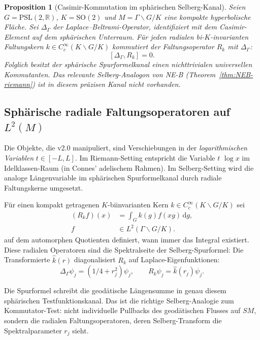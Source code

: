 \documentclass[12pt,a4paper]{article}
\newtheorem{proposition}[theorem]{Proposition}
\theoremstyle{definition}
\theoremstyle{remark}
\newcommand{\RR}{\mathbb{R}}
\newcommand{\Delop}{\Delta_{\Gamma}}
\begin{document}
\begin{proposition}[Casimir-Kommutation im sphärischen Selberg-Kanal]
\label{thm:NEB-fail}
Seien $G=\mathrm{PSL}(2,\RR)$, $K=\mathrm{SO}(2)$ und
$M=\Gamma\backslash G/K$ eine kompakte hyperbolische Fläche.  Sei $\Delop$
der Laplace--Beltrami-Operator, identifiziert mit dem Casimir-Element auf dem
sphärischen Unterraum.  Für jeden radialen bi-$K$-invarianten Faltungskern
$k\in C_c^\infty(K\backslash G/K)$ kommutiert der Faltungsoperator
$R_k$ mit $\Delop$:
\begin{equation}
\label{eq:NEB-commut}
[\Delop, R_k] = 0.
\end{equation}
Folglich besitzt der sphärische Spurformelkanal einen nichttrivialen
universellen Kommutanten. Das relevante Selberg-Analogon von NE-B
(Theorem~\ref{thm:NEB-riemann}) ist in diesem präzisen Kanal nicht vorhanden.
\end{proposition}

\subsection{\texorpdfstring{Sphärische radiale Faltungsoperatoren auf $L^2(M)$}{Sphaerische radiale Faltungsoperatoren auf L2(M)}}

Die Objekte, die v2.0 manipuliert, sind Verschiebungen in der \emph{logarithmischen Variablen}
$t \in [-L, L]$. Im Riemann-Setting entspricht die Variable $t$
$\log x$ im Idelklassen-Raum (in Connes' adelischem Rahmen). Im
Selberg-Setting wird die analoge Längenvariable im sphärischen
Spurformelkanal durch radiale Faltungskerne umgesetzt.

Für einen kompakt getragenen $K$-biinvarianten Kern
$k\in C_c^\infty(K\backslash G/K)$ sei
\[
\begin{aligned}
(R_k f)(x)&=\int_G k(g)f(xg)\,\mathrm{d}g,\\
f&\in L^2(\Gamma\backslash G/K).
\end{aligned}
\]
auf dem automorphen Quotienten definiert, wann immer das Integral existiert.
Diese radialen Operatoren sind die Spektralseite der Selberg-Spurformel: Die
Transformierte $\widehat{k}(r)$ diagonalisiert $R_k$ auf
Laplace-Eigenfunktionen:
\[
\Delop\psi_j=(1/4+r_j^2)\psi_j,
\qquad
R_k\psi_j=\widehat{k}(r_j)\psi_j.
\]

Die Spurformel schreibt die geodätische Längensumme in genau diesem
sphärischen Testfunktionskanal.  Das ist die richtige Selberg-Analogie zum
Kommutator-Test: nicht individuelle Pullbacks des geodätischen Flusses auf
$SM$, sondern die radialen Faltungsoperatoren, deren Selberg-Transform die
Spektralparameter $r_j$ sieht.
\end{document}
